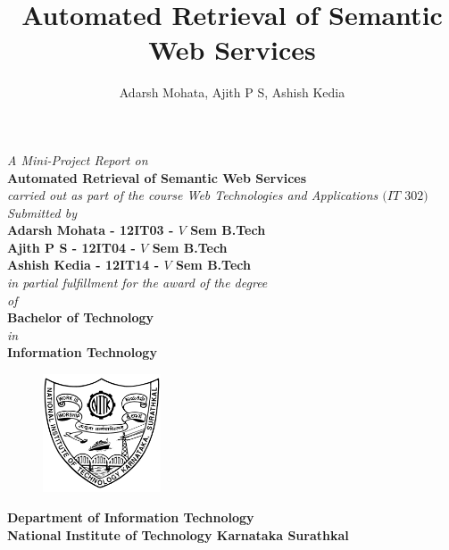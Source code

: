 \documentclass[12pt, twoside]{book}
\title{Automated Retrieval of Semantic Web Services}
\author{Adarsh Mohata, Ajith P S, Ashish Kedia}
\begin{document}
\begin{titlepage}
 \begin{center}
	\emph{A Mini-Project Report on} \\
\vspace{1cm}
\large
\textbf{Automated Retrieval of Semantic Web Services} \\
\normalsize
\vspace{1cm}
\emph{carried out as part of the course Web Technologies and Applications $(IT$ $302)$} \\
\vspace{1cm}
\emph{Submitted by} \\
\vspace{1cm}
\textbf{Adarsh Mohata - 12IT03 - $V$ Sem B.Tech} \\
\vspace{4mm}
\textbf{Ajith P S - 12IT04 - $V$ Sem B.Tech} \\
\vspace{4mm}
\textbf{Ashish Kedia - 12IT14 - $V$ Sem B.Tech} \\
\vspace{1cm}
\emph{in partial fulfillment for the award of the degree} \\
\vspace{7mm}
\emph{of} \\
\vspace{7mm}
\textbf{Bachelor of Technology} \\
\vspace{7mm}
\emph{in} \\
\vspace{7mm}
\textbf{Information Technology}
\vspace{1cm}
\begin{figure}[H]
	\centering
	\includegraphics[height=3.5cm]{pics/nitk_logo.jpg}
\end{figure}
\vspace{1cm}
\textbf{Department of Information Technology} \\
\vspace{5mm}
\textbf{National Institute of Technology Karnataka Surathkal} \\
\vspace{5mm}
\end{center}
\end{titlepage}
\end{document}
